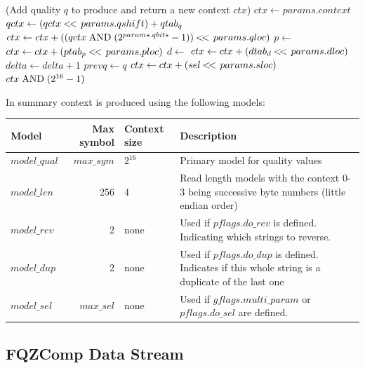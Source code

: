 \documentclass[a4paper]{article}
\begin{document}
\begin{algorithmic}[1]
\Statex
\Statex (Add quality $q$ to produce and return a new context $ctx$)
  \State $ctx \gets params.context$ 
  \State $qctx \gets (qctx \mathbin{<\mkern-3mu<\,} params.qshift) + qtab_q$
  \State $ctx   \gets ctx + ((qctx \bitand (2^{params.qbits}-1)) \shiftl params.qloc)$
   
    \State $p \gets $
    \State $ctx \gets ctx + (ptab_p \mathbin{<\mkern-3mu<\,} params.ploc)$
  \EndIf
   
    \State $d \gets $
    \State $ctx \gets ctx + (dtab_d \mathbin{<\mkern-3mu<\,} params.dloc)$
      \State $delta \gets delta+1$
    \EndIf
    \State $prevq \gets q$
  \EndIf
   
    \State $ctx \gets ctx + (sel \mathbin{<\mkern-3mu<\,} params.sloc)$
  \EndIf
  \State \Return $ctx\bitand (2^{16}-1)$
\EndFunction
\end{algorithmic}

In summary context is produced using the following models:

\begin{table}[h]
\centering
\begin{tabular}{lrlp{9cm}}
 Model & Max symbol & Context size & Description\\
\hline
$model\_qual$ & $max\_sym$ & $2^{16}$ & Primary model for quality values \\
$model\_len$  & 256        & 4       & Read length models with the context 0-3 being successive byte numbers (little endian order) \\
$model\_rev$  & 2          & none    & Used if $pflags.do\_rev$ is defined.  Indicating which strings to reverse. \\
$model\_dup$  & 2          & none    & Used if $pflags.do\_dup$ is defined.  Indicates if this whole string is a duplicate of the last one \\
$model\_sel$  & $max\_sel$ & none    & Used if $gflags.multi\_param$ or $pflags.do\_sel$ are defined. \\
\end{tabular}
\end{table}

\pagebreak
\subsection{FQZComp Data Stream}
\end{document}
